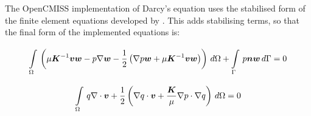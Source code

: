 The OpenCMISS implementation of Darcy's equation uses the stabilised form of the finite element
equations developed by \cite{masud:2002}. This adds stabilising terms, so that the final form
of the implemented equations is:

\begin{equation}
  \gint{\Omega}{}{\left(\mu \tensor{K}^{-1} \vect{v} \vect{w} - p \gradient \vect{w} - %
  \frac{1}{2} \left( \gradient p \vect{w} + \mu \tensor{K}^{-1} \vect{v} \vect{w} \right) \right)}{\Omega} + %
  \gint{\Gamma}{}{p \vect{n} \vect{w}}{\Gamma}= 0
\end{equation}

\begin{equation}
  \gint{\Omega}{}{q \gradient \cdot \vect{v} + %
  \frac{1}{2} \left( \gradient q \cdot \vect{v} + %
  \frac{\tensor{K}}{\mu} \gradient p \cdot \gradient q \right)}{\Omega}= 0
\end{equation}
